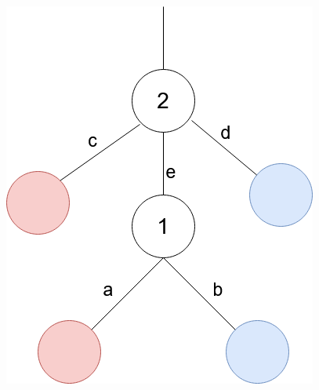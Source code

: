 \documentclass[a4paper]{article}
\begin{document}
\begin{itemize}
\includegraphics{Ex1.png}
    

\end{itemize}
\end{document}
